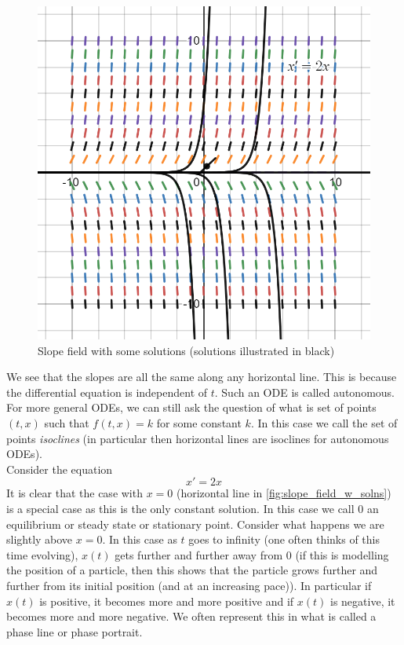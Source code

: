 \begin{figure}
    \centering
    \includegraphics[scale=0.3]{Images/slope_field_with_solns.png}
    \caption{Slope field with some solutions (solutions illustrated in black)}
    \label{fig:slope_field_w_solns}
\end{figure}

We see that the slopes are all the same along any horizontal line. This is because the differential equation is independent of $t$. Such an ODE is called autonomous. For more general ODEs, we can still ask the question of what is set of points $(t, x)$ such that $f(t, x) = k$ for some constant $k$. In this case we call the set of points \textit{isoclines} (in particular then horizontal lines are isoclines for autonomous ODEs).\\

Consider the equation 
$$ x' = 2x $$
It is clear that the case with $x = 0$ (horizontal line in \autoref{fig:slope_field_w_solns}) is a special case as this is the only constant solution. In this case we call $0$ an equilibrium or steady state or stationary point. Consider what happens we are slightly above $x = 0$. In this case as $t$ goes to infinity (one often thinks of this time evolving), $x(t)$ gets further and further away from 0 (if this is modelling the position of a particle, then this shows that the particle grows further and further from its initial position (and at an increasing pace)). In particular if $x(t)$ is positive, it becomes more and more positive and if $x(t)$ is negative, it becomes more and more negative. We often represent this in what is called a phase line or phase portrait.

